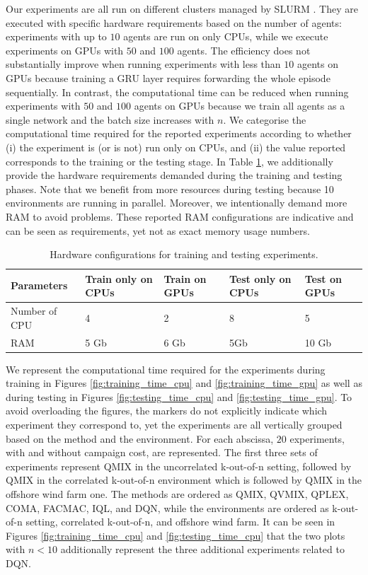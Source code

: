Our experiments are all run on different clusters managed by SLURM \citep{yoo2003slurm}.
They are executed with specific hardware requirements based on the number of agents: experiments with up to $10$ agents are run on only CPUs, while we execute experiments on GPUs with $50$ and $100$ agents.
The efficiency does not substantially improve when running experiments with less than $10$ agents on GPUs because training a GRU layer requires forwarding the whole episode sequentially.
In contrast, the computational time can be reduced when running experiments with $50$ and $100$ agents on GPUs because we train all agents as a single network and the batch size increases with $n$. 
We categorise the computational time required for the reported experiments according to whether (i) the experiment is (or is not) run only on CPUs, and (ii) the value reported corresponds to the training or the testing stage.
In Table \ref{tab:slurmdetails}, we additionally provide the hardware requirements demanded during the training and testing phases.
Note that we benefit from more resources during testing because 10 environments are running in parallel.
Moreover, we intentionally demand more RAM to avoid problems.
These reported RAM configurations are indicative and can be seen as requirements, yet not as exact memory usage numbers.

\begin{table}
  \caption{Hardware configurations for training and testing experiments.}
  \label{tab:slurmdetails}
  \centering
  \begin{tabular}{lllll}
    \toprule
    Parameters & Train only on CPUs & Train on GPUs & Test only on CPUs & Test on GPUs \\ 
    \midrule
    Number of CPU & 4  & 2 & 8 & 5 \\ 
    RAM           & 5 Gb & 6 Gb & 5Gb & 10 Gb \\ 
    \bottomrule
  \end{tabular}
\end{table}

We represent the computational time required for the experiments during training in Figures \ref{fig:training_time_cpu} and \ref{fig:training_time_gpu} as well as during testing in Figures \ref{fig:testing_time_cpu} and \ref{fig:testing_time_gpu}.
To avoid overloading the figures, the markers do not explicitly indicate which experiment they correspond to, yet the experiments are all vertically grouped based on the method and the environment.
For each abscissa, $20$ experiments, with and without campaign cost, are represented.
The first three sets of experiments represent QMIX in the uncorrelated k-out-of-n setting, followed by QMIX in the correlated k-out-of-n environment which is followed by QMIX in the offshore wind farm one.
The methods are ordered as QMIX, QVMIX, QPLEX, COMA, FACMAC, IQL, and DQN, while the environments are ordered as k-out-of-n setting, correlated k-out-of-n, and offshore wind farm.
It can be seen in Figures \ref{fig:training_time_cpu} and \ref{fig:testing_time_cpu} that the two plots with $n<10$ additionally represent the three additional experiments related to DQN.

